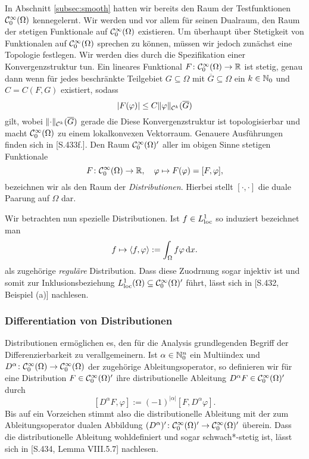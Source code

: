 In Abschnitt \ref{subsec:smooth} hatten wir bereits den Raum der Testfunktionen $\mathcal{C}_0^\infty(\Omega)$ kennegelernt.
Wir werden und vor allem für seinen Dualraum, den Raum der stetigen Funktionale auf $\mathcal{C}_0^\infty(\Omega)$ existieren.
Um überhaupt über Stetigkeit von Funktionalen auf $\mathcal{C}_0^\infty(\Omega)$ sprechen zu können, müssen wir jedoch zunächst eine Topologie festlegen.
Wir werden dies durch die Spezifikation einer Konvergenzstruktur tun.
Ein lineares Funktional $F \colon \mathcal{C}_0^\infty(\Omega) \to \mathbb{R}$ ist stetig, genau dann wenn für jedes beschränkte Teilgebiet $G \subseteq \Omega$ mit $\overline G \subseteq \Omega$ ein $k \in \mathbb{N}_0$ und $C = C(F,G)$ existiert, sodass
$$
|F(\varphi)| \leq C \lVert \varphi \rVert_{\mathcal{C}^k}(\overline G)
$$
gilt, wobei $\lVert \cdot \rVert_{\mathcal{C}^k}(\overline G)$ gerade die
Diese Konvergenzstruktur ist topologisierbar und macht $\mathcal{C}_0^\infty(\Omega)$ zu einem lokalkonvexen Vektorraum.
Genauere Ausführungen finden sich in \cite{werner2011fa}[S.433f.].
Den Raum $\mathcal{C}_0^\infty(\Omega)'$ aller im obigen Sinne stetigen Funktionale
$$
F \colon \mathcal{C}_0^\infty(\Omega) \to \mathbb{R}, \quad \varphi \mapsto F(\varphi) = [F, \varphi],
$$
bezeichnen wir als den Raum der \emph{Distributionen}.
Hierbei stellt $[\cdot,\cdot]$ die duale Paarung auf $\Omega$ dar. 

Wir betrachten nun spezielle Distributionen.
Ist $f \in L^1_{\operatorname{loc}}$ so induziert bezeichnet man 
$$
f \mapsto \langle f, \varphi \rangle := \int_\Omega f \varphi \, {\operatorname{d}\!{x}}.
$$
als zugehörige \emph{reguläre} Distribution.
Dass diese Zuodrnung sogar injektiv ist und somit zur Inklusionsbeziehung $L^1_{\operatorname{loc}}(\Omega) \subseteq \mathcal{C}^\infty_0(\Omega)'$ führt, lässt sich in \cite{werner2011fa}[S.432, Beispiel (a)] nachlesen.

\subsubsection{Differentiation von Distributionen}

Distributionen ermöglichen es, den für die Analysis grundlegenden Begriff der Differenzierbarkeit zu verallgemeinern.
Ist $\alpha \in \mathbb{N}_0^n$ ein Multiindex und $D^\alpha \colon \mathcal{C}_0^\infty(\Omega) \to \mathcal{C}_0^\infty(\Omega)$ der zugehörige Ableitungsoperator, so definieren wir für eine Distribution $F \in \mathcal{C}_0^\infty(\Omega)'$ ihre distributionelle Ableitung $D^\alpha F \in \mathcal{C}_0^\infty(\Omega)'$ durch
$$
  [D^\alpha F, \varphi] := (-1)^{|\alpha|} [F, D^\alpha \varphi].
$$
Bis auf ein Vorzeichen stimmt also die distributionelle Ableitung mit der zum Ableitungsoperator dualen Abbildung $(D^\alpha)' \colon \mathcal{C}_0^\infty(\Omega)' \to \mathcal{C}_0^\infty(\Omega)'$ überein.
Dass die distributionelle Ableitung wohldefiniert und sogar schwach*-stetig ist, lässt sich in \cite{werner2011fa}[S.434, Lemma VIII.5.7] nachlesen.

